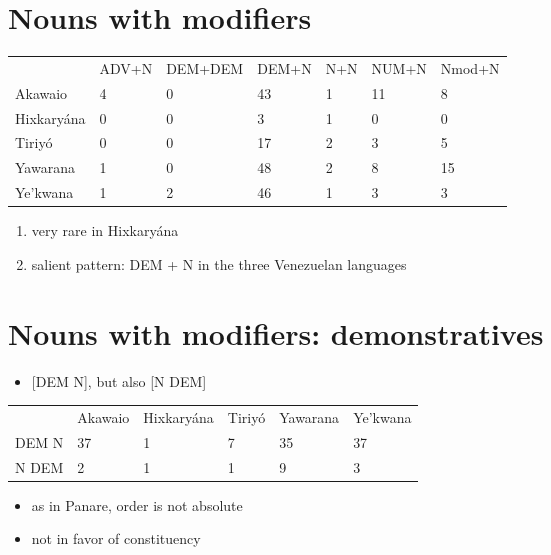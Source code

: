 \documentclass[10pt]{article}
\begin{document}
\section{Nouns with modifiers}\begin{tabular}[t]{lllllll}

           & ADV+N & DEM+DEM & DEM+N & N+N & NUM+N & Nmod+N \\

   Akawaio &     4 &       0 &    43 &   1 &    11 &      8 \\
Hixkaryána &     0 &       0 &     3 &   1 &     0 &      0 \\
    Tiriyó &     0 &       0 &    17 &   2 &     3 &      5 \\
  Yawarana &     1 &       0 &    48 &   2 &     8 &     15 \\
  Ye'kwana &     1 &       2 &    46 &   1 &     3 &      3 \\

\end{tabular}

\begin{enumerate}
\def\labelenumi{\arabic{enumi}.}
\tightlist
\item
  very rare in Hixkaryána
\item
  salient pattern: DEM + N in the three Venezuelan languages
\end{enumerate}

\section{Nouns with modifiers: demonstratives}

\begin{itemize}
\tightlist
\item
  {[}DEM N{]}, but also {[}N DEM{]}
\end{itemize}\begin{tabular}[t]{llllll}

      & Akawaio & Hixkaryána & Tiriyó & Yawarana & Ye'kwana \\

DEM N &      37 &          1 &      7 &       35 &       37 \\
N DEM &       2 &          1 &      1 &        9 &        3 \\

\end{tabular}

\begin{itemize}
\tightlist
\item
  as in Panare, order is not absolute
\item
  not in favor of constituency
\end{itemize}
\end{document}
